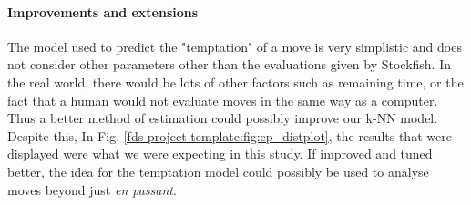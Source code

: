 \documentclass[10pt,a4paper]{article}
\begin{document}
\begin{multicols}{2}
\paragraph{Improvements and extensions}

The model used to predict the "temptation" of a move is very simplistic and does not consider other parameters other than the evaluations given by Stockfish. In the real world, there would be lots of other factors such as remaining time, or the fact that a human would not evaluate moves in the same way as a computer. Thus a better method of estimation could possibly improve our k-NN model. Despite this, In Fig. \ref{fds-project-template:fig:ep_distplot}, the results that were displayed were what we were expecting in this study. If improved and tuned better, the idea for the temptation model could possibly be used to analyse moves beyond just \textit{en passant}.

\end{multicols}

\printbibliography
\end{document}

